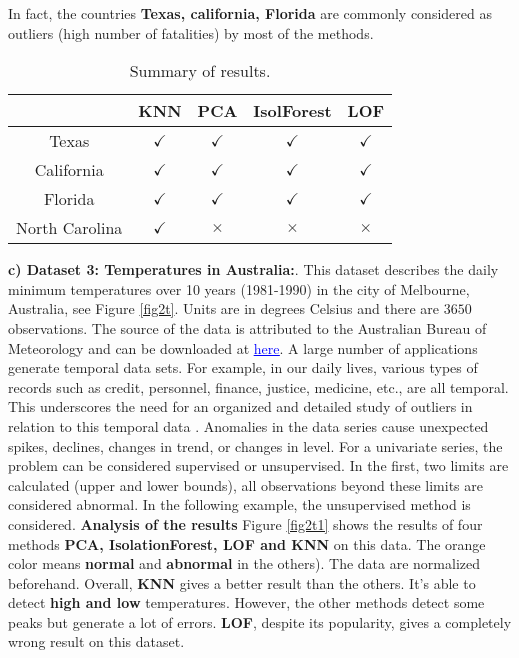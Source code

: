 In fact, the countries \textbf{Texas, california, Florida} are commonly  considered as outliers (high number of fatalities) by most of the methods. 

\begin{table}
\centering
 \begin{tabular}{||c c c c c||} 
 \hline
 &  KNN & PCA & IsolForest & LOF\\ [0.5ex] 
 \hline\hline
Texas & $\checkmark$ & $\checkmark$  & $\checkmark$ & $\checkmark$ \\ 
 California & $\checkmark$ & $\checkmark$  & $\checkmark$ & $\checkmark$ \\
Florida & $\checkmark$ & $\checkmark$  & $\checkmark$ & $\checkmark$ \\
 North Carolina & $\checkmark$ & $\times$  & $\times$ & $\times$ \\ [1ex] 
 \hline
 \end{tabular}
 \caption{Summary of results.}
\end{table}

%
%


\noindent\textbf{c) Dataset 3: Temperatures in Australia:}.
This dataset describes the daily minimum temperatures over 10 years (1981-1990) in the city of Melbourne, Australia, see Figure \ref{fig2t}. Units are in degrees Celsius and there are $3650$ observations. The source of the data is attributed to the Australian Bureau of Meteorology and can be downloaded at \href{https://machinelearningmastery.com/time-series-data-visualization-with-python/}{\textcolor{blue}{\underline{here}}}. A large number of applications generate temporal data sets. For example, in our daily lives, various types of records such as credit, personnel, finance, justice, medicine, etc., are all temporal. This underscores the need for an organized and detailed study of outliers in relation to this temporal data \cite{A5}. Anomalies in the data series cause unexpected spikes, declines, changes in trend, or changes in level. For a univariate series, the problem can be considered supervised or unsupervised. In the first, two limits are calculated (upper and lower bounds), all observations beyond these limits are considered abnormal. In the following example, the unsupervised method is considered.\newl
\noindent\textbf{Analysis of the results} 
Figure \eqref{fig2t1} shows the results of four methods \textbf{PCA, IsolationForest, LOF and KNN} on this data. The orange color means \textbf{normal} and \textbf{abnormal} in the others). The data are normalized beforehand. Overall, \textbf{KNN} gives a better result than the others. It's able to detect \textbf{high and low} temperatures. However, the other methods detect some peaks but generate a lot of errors. \textbf{LOF}, despite its popularity, gives a completely wrong result on this dataset. 


